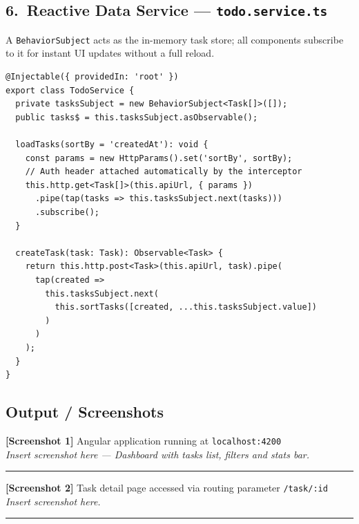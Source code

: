\documentclass[11pt,a4paper]{article}
\begin{document}
\subsection*{6.\ Reactive Data Service — \texttt{todo.service.ts}}

A \texttt{BehaviorSubject} acts as the in-memory task store; all components subscribe to it
for instant UI updates without a full reload.

\begin{lstlisting}[style=ts, language={[Sharp]C}]
@Injectable({ providedIn: 'root' })
export class TodoService {
  private tasksSubject = new BehaviorSubject<Task[]>([]);
  public tasks$ = this.tasksSubject.asObservable();

  loadTasks(sortBy = 'createdAt'): void {
    const params = new HttpParams().set('sortBy', sortBy);
    // Auth header attached automatically by the interceptor
    this.http.get<Task[]>(this.apiUrl, { params })
      .pipe(tap(tasks => this.tasksSubject.next(tasks)))
      .subscribe();
  }

  createTask(task: Task): Observable<Task> {
    return this.http.post<Task>(this.apiUrl, task).pipe(
      tap(created =>
        this.tasksSubject.next(
          this.sortTasks([created, ...this.tasksSubject.value])
        )
      )
    );
  }
}
\end{lstlisting}

\subsection*{Output / Screenshots}

\begin{screenshotbox}
\textbf{[Screenshot 1]} Angular application running at \texttt{localhost:4200}\\[4pt]
\textit{Insert screenshot here — Dashboard with tasks list, filters and stats bar.}\\[60pt]
\rule{\linewidth}{0.4pt}
\end{screenshotbox}

\begin{screenshotbox}
\textbf{[Screenshot 2]} Task detail page accessed via routing parameter \texttt{/task/:id}\\[4pt]
\textit{Insert screenshot here.}\\[45pt]
\rule{\linewidth}{0.4pt}
\end{screenshotbox}
\end{document}
